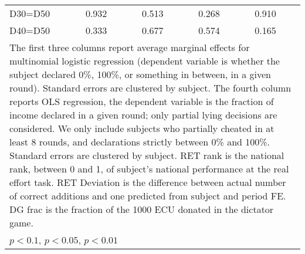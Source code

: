 \begin{tabular}{l|cccccc|cc}
D30=D50         &    0.932         &         &    0.513         &         &    0.268         &         &    0.910         &         \\
D40=D50         &    0.333         &         &    0.677         &         &    0.574         &         &    0.165         &         \\
\hline\hline
\multicolumn{9}{p{16cm}}{\tiny The first three columns report average marginal effects for multinomial logistic regression (dependent variable is whether the subject declared 0\%, 100\%, or something in between, in a given round). Standard errors are clustered by subject. The fourth column reports OLS regression, the dependent variable is the fraction of income declared in a given round; only partial lying decisions are considered. We only include subjects who partially cheated in at least 8 rounds, and declarations strictly between 0\% and 100\%. Standard errors are clustered by subject. RET rank is the national rank, between 0 and 1, of subject's national performance at the real effort task. RET Deviation is the difference between actual number of correct additions and one predicted from subject and period FE. DG frac is the fraction of the 1000 ECU donated in the dictator game.}\\
\multicolumn{9}{l}{\tiny \sym{*} \(p<0.1\), \sym{**} \(p<0.05\), \sym{***} \(p<0.01\)}\\
\end{tabular}